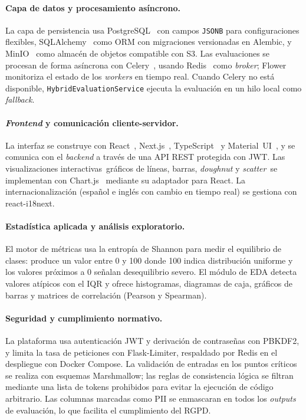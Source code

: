 \paragraph{Capa de datos y procesamiento asíncrono.}
La capa de persistencia usa PostgreSQL~\citep{postgresql} con campos
\texttt{JSONB} para configuraciones flexibles, SQLAlchemy~\citep{sqlalchemy}
como \ac{ORM} con migraciones versionadas en Alembic, y
MinIO~\citep{minio} como almacén de objetos compatible con S3.
Las evaluaciones se procesan de forma asíncrona con
Celery~\citep{celery}, usando Redis~\citep{redis} como \emph{broker};
Flower monitoriza el estado de los \emph{workers} en tiempo real.
Cuando Celery no está disponible, \texttt{HybridEvaluationService} ejecuta
la evaluación en un hilo local como \emph{fallback}.

\paragraph{\emph{Frontend} y comunicación cliente-servidor.}
La interfaz se construye con React~\citep{react}, Next.js~\citep{nextjs},
TypeScript~\citep{typescript} y Material~\ac{UI}~\citep{materialui}, y se
comunica con el \emph{backend} a través de una \ac{API} \ac{REST} protegida
con \ac{JWT}.  Las visualizaciones interactivas~\textemdash gráficos de
líneas, barras, \emph{doughnut} y \emph{scatter}~\textemdash se implementan
con Chart.js~\citep{chartjs} mediante su adaptador para React.
La internacionalización (español e inglés con cambio en tiempo real) se
gestiona con react-i18next.

\paragraph{Estadística aplicada y análisis exploratorio.}
El motor de métricas usa la entropía de Shannon para medir el equilibrio
de clases: produce un valor entre 0 y 100 donde 100 indica distribución
uniforme y los valores próximos a 0 señalan desequilibrio severo.
El módulo de \ac{EDA} detecta valores atípicos con el \ac{IQR} y ofrece
histogramas, diagramas de caja, gráficos de barras y matrices de
correlación (Pearson y Spearman).

\paragraph{Seguridad y cumplimiento normativo.}
La plataforma usa autenticación \ac{JWT} y derivación de contraseñas con
\ac{PBKDF2}, y limita la tasa de peticiones con Flask-Limiter, respaldado
por Redis en el despliegue con Docker Compose.  La validación de entradas
en los puntos críticos se realiza con esquemas Marshmallow; las reglas de
consistencia lógica se filtran mediante una lista de tokens prohibidos para
evitar la ejecución de código arbitrario.  Las columnas marcadas como
\ac{PII} se enmascaran en todos los \emph{outputs} de evaluación, lo que
facilita el cumplimiento del \ac{RGPD}.

